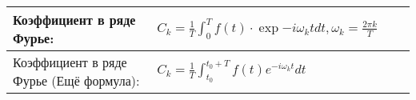 \documentclass{article}
\begin{document}
\begin{tabular}{ |p{6cm}|p{3cm}|p{6cm}|p{3.5cm}|  }
                                                                           \\
\hline
Коэффициент в ряде Фурье:                                                  &
$C_{k}=\frac{1}{T} \int_{0}^{T} f(t) \cdot \exp{-i \omega_{k} t} d t, \omega_{k}=\frac{2 \pi k}{T}$&
                                                                           &
                                                                           \\
\hline
Коэффициент в ряде Фурье (Ещё формула):                                    &
$C_{k}=\frac{1}{T} \int_{t_{0}}^{t_{0}+T} f(t) e^{-i \omega_{k} t} d t$    &
                                                                           &
                                                                           \\
\hline
\end{tabular}
\end{document}
